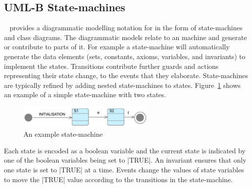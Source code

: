 
\subsection{UML-B State-machines}
\label{sec:iumlb}

\UMLB~\cite{said15:umlbSosym,snook14:iumlbStatem,snook06umlbTosem} provides a diagrammatic modelling notation for \EventB in the form of state-machines and class diagrams. 
The diagrammatic models relate to an \EventB machine and generate or contribute to parts of it. 
For example a state-machine will automatically generate the \EventB data elements (sets, constants, axioms, variables, and invariants) to implement the states. 
Transitions contribute further guards and actions representing their state change, to the events that they elaborate.  
State-machines are typically refined by adding nested state-machines to states.
Figure~\ref{fig:iumlb-sm} shows an example of a simple state-machine with two states.
\begin{figure}[!h]
	\vspace{-.5cm}
	\centering
	\includegraphics[width=0.6\textwidth]{figures/iumlb-SM}
	\caption{An example \UMLB state-machine}
	\label{fig:iumlb-sm}
	\vspace{-.5cm}
\end{figure}

Each state is encoded as a boolean variable and the current state is indicated by one of the boolean variables being set to |TRUE|. 
An invariant ensures that only one state is set to |TRUE| at a time.
Events change the values of state variables to move the |TRUE| value according to the transitions in the state-machine.  
	
